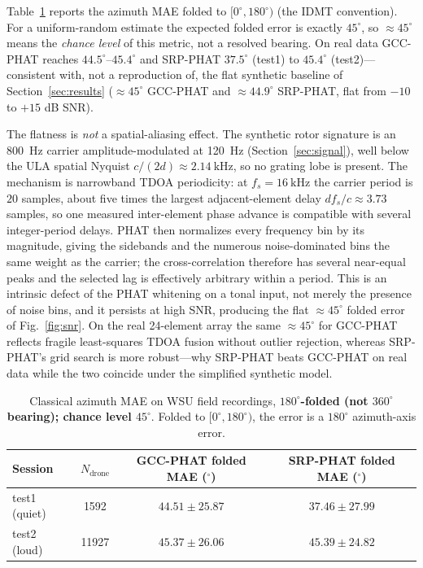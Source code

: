 \documentclass[5p,twocolumn]{elsarticle}
\begin{document}
Table~\ref{tab:wsu_mae} reports the azimuth MAE folded to $[0^\circ,180^\circ)$ (the IDMT convention). For a uniform-random estimate the expected folded error is exactly $45^\circ$, so $\approx45^\circ$ means the \emph{chance level} of this metric, not a resolved bearing. On real data GCC-PHAT reaches $44.5^\circ$--$45.4^\circ$ and SRP-PHAT $37.5^\circ$ (test1) to $45.4^\circ$ (test2)---consistent with, not a reproduction of, the flat synthetic baseline of Section~\ref{sec:results} ($\approx45^\circ$ GCC-PHAT and $\approx44.9^\circ$ SRP-PHAT, flat from $-10$ to $+15$ dB SNR).

The flatness is \emph{not} a spatial-aliasing effect. The synthetic rotor signature is an \SI{800}{\hertz} carrier amplitude-modulated at \SI{120}{\hertz} (Section~\ref{sec:signal}), well below the ULA spatial Nyquist $c/(2d)\approx\SI{2.14}{\kHz}$, so no grating lobe is present. The mechanism is narrowband TDOA periodicity: at $f_s=\SI{16}{\kilo\hertz}$ the carrier period is $20$ samples, about five times the largest adjacent-element delay $df_s/c\approx3.73$ samples, so one measured inter-element phase advance is compatible with several integer-period delays. PHAT then normalizes every frequency bin by its magnitude, giving the sidebands and the numerous noise-dominated bins the same weight as the carrier; the cross-correlation therefore has several near-equal peaks and the selected lag is effectively arbitrary within a period. This is an intrinsic defect of the PHAT whitening on a tonal input, not merely the presence of noise bins, and it persists at high SNR, producing the flat $\approx45^\circ$ folded error of Fig.~\ref{fig:snr}. On the real \num{24}-element array the same $\approx45^\circ$ for GCC-PHAT reflects fragile least-squares TDOA fusion without outlier rejection, whereas SRP-PHAT's grid search is more robust---why SRP-PHAT beats GCC-PHAT on real data while the two coincide under the simplified synthetic model.
\begin{table}[t]
\centering
\caption{Classical azimuth MAE on WSU field recordings, \textbf{$180^\circ$-folded (not $360^\circ$ bearing); chance level $45^\circ$}. Folded to $[0^\circ,180^\circ)$, the error is a $180^\circ$ azimuth-axis error.}
\label{tab:wsu_mae}
\begin{tabular}{lccc}
\toprule
Session & $N_{\text{drone}}$ & GCC-PHAT folded MAE ($^\circ$) & SRP-PHAT folded MAE ($^\circ$) \\
\midrule
test1 (quiet) & \num{1592} & $44.51\pm25.87$ & $37.46\pm27.99$ \\
test2 (loud) & \num{11927} & $45.37\pm26.06$ & $45.39\pm24.82$ \\
\bottomrule
\end{tabular}
\end{table}
\end{document}
